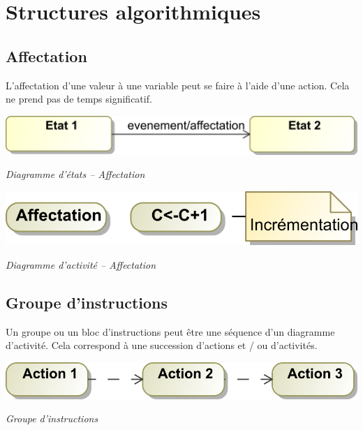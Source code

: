 \documentclass[10pt,fleqn]{article} %
\begin{document}
\section{Structures algorithmiques}
\subsection{Affectation}
L’affectation d’une valeur à une variable peut se faire à l’aide d’une action. Cela ne prend pas
de temps significatif.

\begin{minipage}[c]{.48\linewidth}
\begin{center}
\includegraphics[width=\textwidth]{images/etat_affectation}

\textit{Diagramme d'états -- Affectation}
\end{center}
\end{minipage} \hfill
\begin{minipage}[c]{.48\linewidth}
\begin{center}
\includegraphics[width=.75\textwidth]{images/activite_affectation}

\textit{Diagramme d'activité -- Affectation}
\end{center}
\end{minipage}

\subsection{Groupe d'instructions}

Un groupe ou un bloc d’instructions peut être une séquence d’un diagramme
d’activité. Cela correspond à une succession d’actions et / ou d’activités.

\begin{center}
\includegraphics[width=.5\textwidth]{images/GroupeInstruction}

\textit{Groupe d'instructions}
\end{center}
\end{document}
